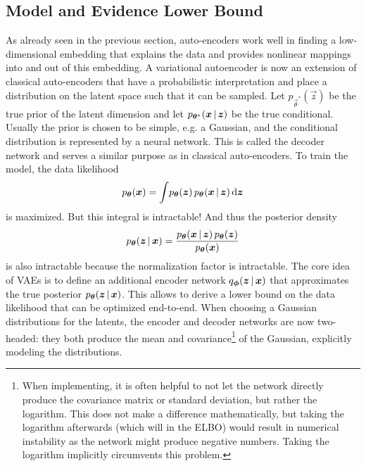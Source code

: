 		\subsection{Model and Evidence Lower Bound}
			As already seen in the previous section, auto-encoders work well in finding a low-dimensional embedding that explains the data and provides nonlinear mappings into and out of this embedding. A variational autoencoder is now an extension of classical auto-encoders that have a probabilistic interpretation and place a distribution on the latent space such that it can be sampled. Let \( p_{\vec{\theta}^\ast}(\vec{z}) \) be the true prior of the latent dimension and let \( p_{\bm{\theta}^\ast}(\bm{x} \,\vert\, \bm{z}) \) be the true conditional. Usually the prior is chosen to be simple, e.g. a Gaussian, and the conditional distribution is represented by a neural network. This is called the decoder network and serves a similar purpose as in classical auto-encoders. To train the model, the data likelihood
			\begin{equation}
				p_{\bm{\theta}}(\bm{x}) = \int\! p_{\bm{\theta}}(\bm{z}) \, p_{\bm{\theta}}(\bm{x} \,\vert\, \bm{z}) \dd{\bm{z}}  \label{eq:vaeLikelihood}
			\end{equation}
			is maximized. But this integral is intractable! And thus the posterior density
			\begin{equation}
				p_{\bm{\theta}}(\bm{z} \,\vert\, \bm{x}) = \frac{p_{\bm{\theta}}(\bm{x} \,\vert\, \bm{z}) \, p_{\bm{\theta}}(\bm{z})}{p_{\bm{\theta}}(\bm{x})}
			\end{equation}
			is also intractable because the normalization factor is intractable. The core idea of VAEs is to define an additional encoder network \( q_{\bm{\phi}}(\bm{z} \,\vert\, \bm{x}) \) that approximates the true posterior \( p_{\bm{\theta}}(\bm{z} \,\vert\, \bm{x}) \). This allows to derive a lower bound on the data likelihood that can be optimized end-to-end. When choosing a Gaussian distributions for the latents, the encoder and decoder networks are now two-headed: they both produce the mean and covariance\footnote{When implementing, it is often helpful to not let the network directly produce the covariance matrix or standard deviation, but rather the logarithm. This does not make a difference mathematically, but taking the logarithm afterwards (which will in the ELBO) would result in numerical instability as the network might produce negative numbers. Taking the logarithm implicitly circumvents this problem.} of the Gaussian, explicitly modeling the distributions.

